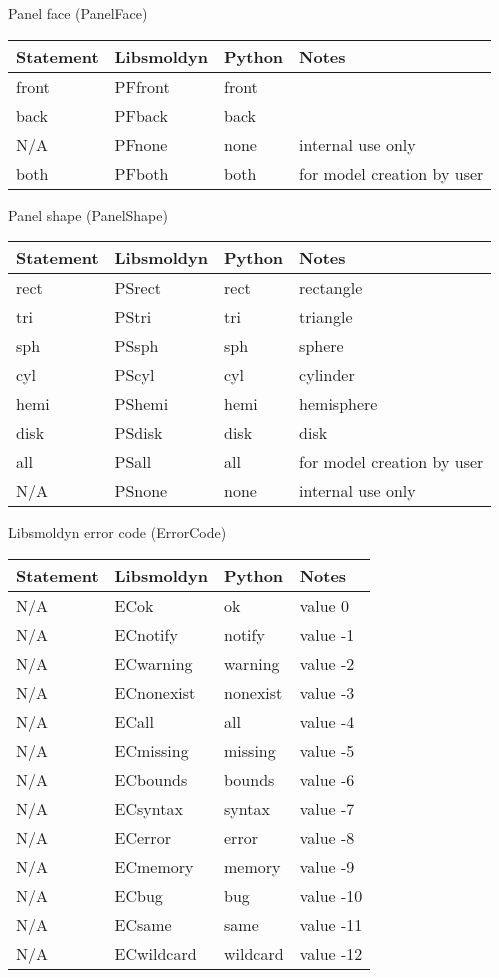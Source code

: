 \documentclass {book}
\begin{document}
Panel face (PanelFace)
\begin{longtable}[c]{llll}
Statement & Libsmoldyn & Python & Notes\\
\hline
front & PFfront & front\\
back & PFback & back\\
N/A & PFnone & none & internal use only\\
both & PFboth & both & for model creation by user
\end{longtable}

Panel shape (PanelShape)
\begin{longtable}[c]{llll}
Statement & Libsmoldyn & Python & Notes\\
\hline
rect & PSrect & rect & rectangle\\
tri & PStri & tri & triangle\\
sph & PSsph & sph & sphere\\
cyl & PScyl & cyl & cylinder\\
hemi & PShemi & hemi & hemisphere\\
disk & PSdisk & disk & disk\\
all & PSall & all & for model creation by user\\
N/A & PSnone & none & internal use only
\end{longtable}

Libsmoldyn error code (ErrorCode)
\begin{longtable}[c]{llll}
Statement & Libsmoldyn & Python & Notes\\
\hline
N/A & ECok & ok & value 0\\
N/A & ECnotify & notify & value -1\\
N/A & ECwarning & warning & value -2\\
N/A & ECnonexist & nonexist & value -3\\
N/A & ECall & all & value -4\\
N/A & ECmissing & missing & value -5\\
N/A & ECbounds & bounds & value -6\\
N/A & ECsyntax & syntax & value -7\\
N/A & ECerror & error & value -8\\
N/A & ECmemory & memory & value -9\\
N/A & ECbug & bug & value -10\\
N/A & ECsame & same & value -11\\
N/A & ECwildcard & wildcard & value -12
\end{longtable}
\end{document}
